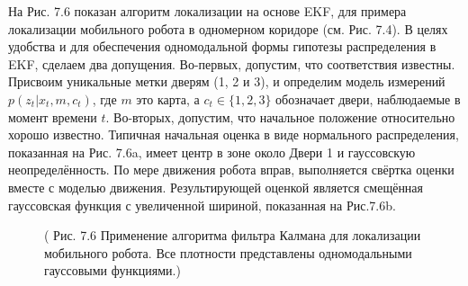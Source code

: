 \documentclass[10pt,a4paper]{article}
\begin{document}
На Рис. 7.6 показан алгоритм локализации на основе EKF, для примера локализации мобильного робота в одномерном коридоре (см. Рис. 7.4). В целях удобства и для обеспечения одномодальной формы гипотезы распределения в EKF, сделаем два допущения. Во-первых, допустим, что соответствия известны. Присвоим уникальные метки дверям (1, 2 и 3), и определим модель измерений $p(z_t | x_t, m, c_t)$, где $m$  это карта, а $c_t\in\{1, 2, 3\}$ обозначает двери, наблюдаемые в момент времени $t$. Во-вторых, допустим, что начальное положение относительно хорошо известно. Типичная начальная оценка в виде нормального распределения, показанная на Рис. 7.6a, имеет центр в зоне около Двери 1 и гауссовскую  неопределённость. По мере движения робота вправ, выполняется свёртка оценки вместе с моделью движения. Результирующей оценкой является смещённая гауссовская функция с увеличенной шириной, показанная на Рис.7.6b.

\begin{figure}[H]
	\caption{ (  Рис. 7.6 Применение алгоритма фильтра Калмана для локализации мобильного робота. Все плотности представлены одномодальными гауссовыми функциями.)}
	\label{fig:76orig}
\end{figure}
\end{document}
